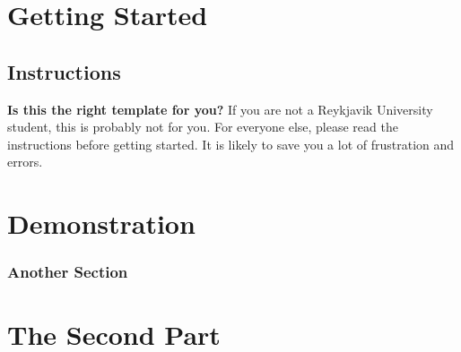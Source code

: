 \documentclass[showtrims]{rubook}
\begin{document}
\part{Getting Started} %
\chapter{Instructions}
\textbf{Is this the right template for you?}
If you are not a Reykjavik University student, this is probably not for you.
For everyone else, please read the instructions before getting started.
It is likely to save you a lot of frustration and errors.
\part{Demonstration}
\section{Another Section}
\part{The Second Part} %




\appendix{}%


\clearforchapter{}
\printindex{}%
\end{document}
